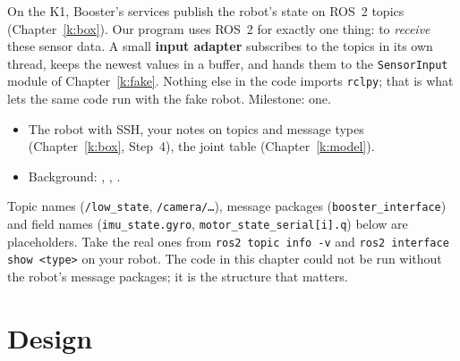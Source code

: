\label{k:ros}

On the K1, Booster's services publish the robot's state on ROS~2 topics (Chapter~\ref{k:box}). Our program uses ROS~2 for exactly one thing: to \emph{receive} these sensor data. A small \textbf{input adapter} subscribes to the topics in its own thread, keeps the newest values in a buffer, and hands them to the \texttt{SensorInput} module of Chapter~\ref{k:fake}. Nothing else in the code imports \texttt{rclpy}; that is what lets the same code run with the fake robot. Milestone: one.

\begin{needbox}
\begin{itemize}[nosep]
  \item The robot with SSH, your notes on topics and message types (Chapter~\ref{k:box}, Step~4), the joint table (Chapter~\ref{k:model}).
  \item Background: , , .
\end{itemize}
\end{needbox}

\begin{guessbox}
Topic names (\texttt{/low\_state}, \texttt{/camera/\dots}), message packages (\texttt{booster\_interface}) and field names (\texttt{imu\_state.gyro}, \texttt{motor\_state\_serial[i].q}) below are placeholders\guess. Take the real ones from \verb!ros2 topic info -v! and \verb!ros2 interface show <type>! on your robot. The code in this chapter could not be run without the robot's message packages; it is the structure that matters.
\end{guessbox}

\section*{Design}
\begin{center}
\end{center}

